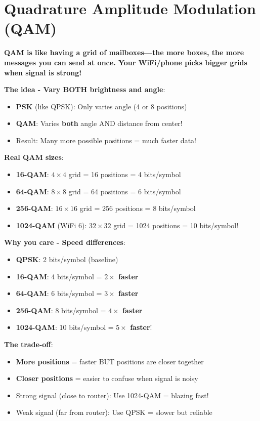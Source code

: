 \chapter{Quadrature Amplitude Modulation (QAM)}
\label{ch:qam}

\begin{nontechnical}

\textbf{QAM is like having a grid of mailboxes---the more boxes, the more messages you can send at once. Your WiFi/phone picks bigger grids when signal is strong!}

\textbf{The idea - Vary BOTH brightness and angle}:
\begin{itemize}
\item \textbf{PSK} (like QPSK): Only varies angle (4 or 8 positions)
\item \textbf{QAM}: Varies \textbf{both} angle AND distance from center!
\item Result: Many more possible positions = much faster data!
\end{itemize}

\textbf{Real QAM sizes}:
\begin{itemize}
\item \textbf{16-QAM}: $4 \times 4$ grid = 16 positions = 4 bits/symbol
\item \textbf{64-QAM}: $8 \times 8$ grid = 64 positions = 6 bits/symbol
\item \textbf{256-QAM}: $16 \times 16$ grid = 256 positions = 8 bits/symbol
\item \textbf{1024-QAM} (WiFi 6): $32 \times 32$ grid = 1024 positions = 10 bits/symbol!
\end{itemize}

\textbf{Why you care - Speed differences}:
\begin{itemize}
\item \textbf{QPSK}: 2 bits/symbol (baseline)
\item \textbf{16-QAM}: 4 bits/symbol = \textbf{$2\times$ faster}
\item \textbf{64-QAM}: 6 bits/symbol = \textbf{$3\times$ faster}
\item \textbf{256-QAM}: 8 bits/symbol = \textbf{$4\times$ faster}
\item \textbf{1024-QAM}: 10 bits/symbol = \textbf{$5\times$ faster}!
\end{itemize}

\textbf{The trade-off}:
\begin{itemize}
\item \textbf{More positions} = faster BUT positions are closer together
\item \textbf{Closer positions} = easier to confuse when signal is noisy
\item Strong signal (close to router): Use 1024-QAM = blazing fast!
\item Weak signal (far from router): Use QPSK = slower but reliable
\end{itemize}


\end{nontechnical}

